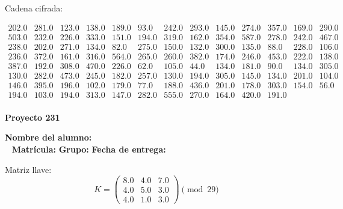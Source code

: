 \documentclass[12pt]{article}
\begin{document}
Cadena cifrada:
\begin{center}
$\begin{array}{lllllllllllll}
202.0 & 281.0 & 123.0 & 138.0 & 189.0 & 93.0 & 242.0 & 293.0 & 145.0 & 274.0 & 357.0 & 169.0 & 290.0\\
503.0 & 232.0 & 226.0 & 333.0 & 151.0 & 194.0 & 319.0 & 162.0 & 354.0 & 587.0 & 278.0 & 242.0 & 467.0\\
238.0 & 202.0 & 271.0 & 134.0 & 82.0 & 275.0 & 150.0 & 132.0 & 300.0 & 135.0 & 88.0 & 228.0 & 106.0\\
236.0 & 372.0 & 161.0 & 316.0 & 564.0 & 265.0 & 260.0 & 382.0 & 174.0 & 246.0 & 453.0 & 222.0 & 138.0\\
387.0 & 192.0 & 308.0 & 470.0 & 226.0 & 62.0 & 105.0 & 44.0 & 134.0 & 181.0 & 90.0 & 134.0 & 305.0\\
130.0 & 282.0 & 473.0 & 245.0 & 182.0 & 257.0 & 130.0 & 194.0 & 305.0 & 145.0 & 134.0 & 201.0 & 104.0\\
146.0 & 395.0 & 196.0 & 102.0 & 179.0 & 77.0 & 188.0 & 436.0 & 201.0 & 178.0 & 303.0 & 154.0 & 56.0\\
194.0 & 103.0 & 194.0 & 313.0 & 147.0 & 282.0 & 555.0 & 270.0 & 164.0 & 420.0 & 191.0\\
\end{array}$
\end{center}

\newpage


\textbf{Proyecto 231}

\textbf{Nombre del alumno:} \underline{\hspace{13cm}}\\\
\vspace{1cm}
\textbf{Matrícula:} \underline{\hspace{4cm}} \hspace{1cm}
\textbf{Grupo:} \underline{\hspace{2cm}}
\textbf{Fecha de entrega:} \underline{\hspace{2cm}}

\medskip

Matriz llave:
\[
K = \begin{pmatrix}
8.0 & 4.0 & 7.0\\
4.0 & 5.0 & 3.0\\
4.0 & 1.0 & 3.0
\end{pmatrix} \pmod{29}
\]
\end{document}
